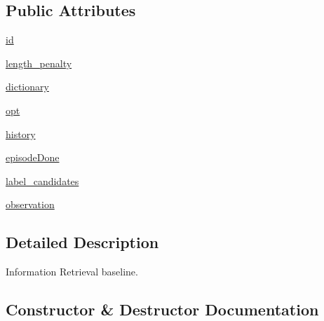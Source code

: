 \subsection*{Public Attributes}
\begin{DoxyCompactItemize}
\item 
\hyperlink{classparlai_1_1agents_1_1ir__baseline_1_1ir__baseline_1_1IrBaselineAgent_afdd605338d0cea9ff8813474b07c21e0}{id}
\item 
\hyperlink{classparlai_1_1agents_1_1ir__baseline_1_1ir__baseline_1_1IrBaselineAgent_a766788ecf47ab2d015b92dc2c9c191e3}{length\+\_\+penalty}
\item 
\hyperlink{classparlai_1_1agents_1_1ir__baseline_1_1ir__baseline_1_1IrBaselineAgent_aedad9637cf632a08f3008765d3debcfa}{dictionary}
\item 
\hyperlink{classparlai_1_1agents_1_1ir__baseline_1_1ir__baseline_1_1IrBaselineAgent_a2c83d3c7e15884871dbfabea9f110933}{opt}
\item 
\hyperlink{classparlai_1_1agents_1_1ir__baseline_1_1ir__baseline_1_1IrBaselineAgent_a8644e518e11536f13338eafcda213d0c}{history}
\item 
\hyperlink{classparlai_1_1agents_1_1ir__baseline_1_1ir__baseline_1_1IrBaselineAgent_ae7e51422143ac04c563c6af1d777a564}{episode\+Done}
\item 
\hyperlink{classparlai_1_1agents_1_1ir__baseline_1_1ir__baseline_1_1IrBaselineAgent_aa7619e8bcb4c75322f0ce7ac9a6cb860}{label\+\_\+candidates}
\item 
\hyperlink{classparlai_1_1agents_1_1ir__baseline_1_1ir__baseline_1_1IrBaselineAgent_a5bc444602ee2228fd3340a5c6a5615d8}{observation}
\end{DoxyCompactItemize}


\subsection{Detailed Description}
\begin{DoxyVerb}Information Retrieval baseline.
\end{DoxyVerb}
 

\subsection{Constructor \& Destructor Documentation}
\mbox{\label{classparlai_1_1agents_1_1ir__baseline_1_1ir__baseline_1_1IrBaselineAgent_a7c734ad9e54fd95fc080e9e51f7a7bbc}} 
